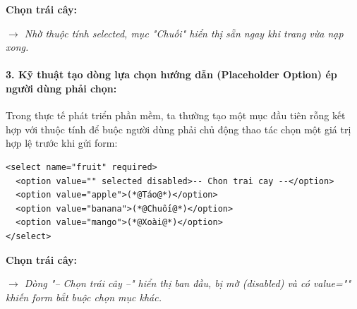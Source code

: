\begin{browserWindow}
\sffamily\small
\textbf{Chọn trái cây:} \par\vspace{4pt}
\tcbox[on line, arc=3pt, colback=white, colframe=primaryBlue!50, boxsep=3pt, left=8pt, right=20pt, top=3pt, bottom=3pt]{%
  \small \textcolor{black}{Chuối} \;\; \textcolor{primaryBlue}{\textbf{$\boldsymbol{\vee}$}}%
} \par\vspace{4pt}
\textcolor{codeComment}{\small\textit{$\rightarrow$ Nhờ thuộc tính selected, mục "Chuối" hiển thị sẵn ngay khi trang vừa nạp xong.}}
\end{browserWindow}

\paragraph{3. Kỹ thuật tạo dòng lựa chọn hướng dẫn (Placeholder Option) ép người dùng phải chọn:}
Trong thực tế phát triển phần mềm, ta thường tạo một mục đầu tiên rỗng kết hợp với thuộc tính  để buộc người dùng phải chủ động thao tác chọn một giá trị hợp lệ trước khi gửi form:

\begin{codeWindow}
\begin{lstlisting}[language=HTML5]
<select name="fruit" required>
  <option value="" selected disabled>-- Chon trai cay --</option>
  <option value="apple">(*@Táo@*)</option>
  <option value="banana">(*@Chuối@*)</option>
  <option value="mango">(*@Xoài@*)</option>
</select>
\end{lstlisting}
\end{codeWindow}

\begin{browserWindow}
\sffamily\small
\textbf{Chọn trái cây:} \par\vspace{4pt}
\tcbox[on line, arc=3pt, colback=white, colframe=primaryBlue!50, boxsep=3pt, left=8pt, right=20pt, top=3pt, bottom=3pt]{%
  \small \textcolor{gray!70}{-- Chọn trái cây --} \;\; \textcolor{primaryBlue}{\textbf{$\boldsymbol{\vee}$}}%
} \par\vspace{4pt}
\textcolor{codeComment}{\small\textit{$\rightarrow$ Dòng "-- Chọn trái cây --" hiển thị ban đầu, bị mờ (disabled) và có value="" khiến form bắt buộc chọn mục khác.}}
\end{browserWindow}


